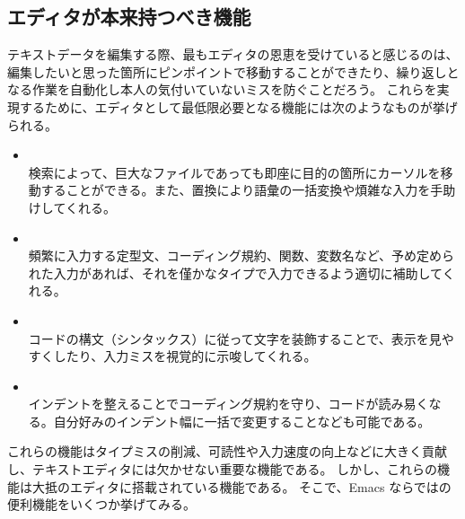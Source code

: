 \subsection{エディタが本来持つべき機能}
テキストデータを編集する際、最もエディタの恩恵を受けていると感じるのは、編集したいと思った箇所にピンポイントで移動することができたり、繰り返しとなる作業を自動化し本人の気付いていないミスを防ぐことだろう。
これらを実現するために、エディタとして最低限必要となる機能には次のようなものが挙げられる。
\begin{itemize}\setlength{\leftskip}{-1.00zw}%
\item {}             \\
  検索によって、巨大なファイルであっても即座に目的の箇所にカーソルを移動することができる。また、置換により語彙の一括変換や煩雑な入力を手助けしてくれる。
\item {}         \\
  頻繁に入力する定型文、コーディング規約、関数、変数名など、予め定められた入力があれば、それを僅かなタイプで入力できるよう適切に補助してくれる。
\item {} \\
  コードの構文（シンタックス）に従って文字を装飾することで、表示を見やすくしたり、入力ミスを視覚的に示唆してくれる。
\item {}             \\
  インデントを整えることでコーディング規約を守り、コードが読み易くなる。自分好みのインデント幅に一括で変更することなども可能である。
\end{itemize}
これらの機能はタイプミスの削減、可読性や入力速度の向上などに大きく貢献し、テキストエディタには欠かせない重要な機能である。
しかし、これらの機能は大抵のエディタに搭載されている機能である。
そこで、Emacs ならではの便利機能をいくつか挙げてみる。
